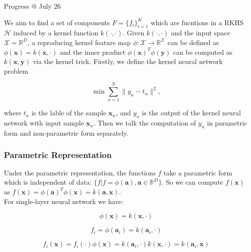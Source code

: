 \documentclass{article}
\begin{document}
\newpage
\LARGE Progress @ July 26\normalsize\vspace{3ex}

\par We aim to find a set of components $F = \{f_i\}_{i=1}^{K}$ which are fucntions in a RKHS $\mathcal{H}$ induced by a kernel function $k(\cdot, \cdot)$. Given $k(\cdot, \cdot)$ and the input space $\mathcal{X} = \mathbb{R}^D$, a reproducing kernel feature map $\phi: \mathcal{X}\rightarrow\mathbb{R}^\mathcal{X}$ can be defined as $\phi(\mathbf{x}) = k(\mathbf{x}, \cdot)$ and the inner product $\phi(\mathbf{x})^{T}\phi(\mathbf{y})$ can be computed as $k(\mathbf{x}, \mathbf{y})$ via the kernel trick.
Firstly, we define the kernel neural network problem

\begin{equation}
\min\sum_{n=1}^{N}\|y_n - t_n\|^2,
\end{equation}

where $t_n$ is the lable of the sample $\mathbf{x}_n$, and $y_n$ is the output of the kernel neural network with input sample $\mathbf{x}_n$. Then we talk the computation of $y_n$ in parametric form and non-parametric form separately.

\subsubsection{Parametric Representation}
Under the parametric representation, the functions $f$ take a parametric form which is independent of data: $\{f|f = \phi(\mathbf{a}), \mathbf{a}\in \mathbb{R}^D\}$. So we can compute $f(\mathbf{x})$ as $f(\mathbf{x}) = \phi(\mathbf{a})^T \phi(\mathbf{x}) = k(\mathbf{a}, \mathbf{x})$.\\

For single-layer neural network we have:

\begin{equation}
\phi(\mathbf{x}) = k(\mathbf{x},\cdot)
\end{equation}

\begin{equation}
f_i = \phi(\mathbf{a}_i) = k(\mathbf{a}_i,\cdot)
\end{equation}

\begin{equation}
f_i(\mathbf{x}) = f_i(\cdot)\phi(\mathbf{x}) = k(\mathbf{a}_i,\cdot) k(\mathbf{x},\cdot) = k(\mathbf{a}_i,\mathbf{x})
\end{equation}
\end{document}

